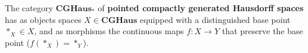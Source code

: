 The category $\mathbf{CGHaus}_*$ of \textbf{pointed compactly generated Hausdorff spaces} has as objects spaces $X \in \mathbf{CGHaus}$ equipped with a distinguished base point $*_X \in X$, and as morphisms the continuous maps $f: X \to Y$ that preserve the base point ($f(*_X) = *_Y$).
